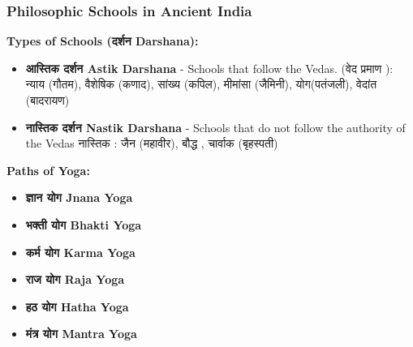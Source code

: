 \begin{frame}[fragile]\frametitle{Philosophic Schools in Ancient India}
    \textbf{Types of Schools (दर्शन  Darshana):}
    \begin{itemize}
        \item \textbf{आस्तिक  दर्शन Astik Darshana} - Schools that follow the Vedas. (वेद प्रमाण ): न्याय (गौतम), वैशेषिक (कणाद), सांख्य (कपिल), मीमांसा (जैमिनी), योग(पतंजली), वेदांत (बादरायण)
        \item \textbf{नास्तिक  दर्शन  Nastik Darshana} - Schools that do not follow the authority of the Vedas नास्तिक : जैन (महावीर), बौद्ध , चार्वाक (बृहस्पती)
    \end{itemize}
	
    \textbf{Paths of Yoga:}
    \begin{itemize}
        \item \textbf{ज्ञान योग Jnana Yoga}
        \item \textbf{भक्ती योग  Bhakti Yoga}
        \item \textbf{कर्म योग Karma Yoga}
        \item \textbf{राज योग Raja Yoga}
        \item \textbf{हठ योग Hatha Yoga}
        \item \textbf{मंत्र योग Mantra Yoga}
    \end{itemize}	
\end{frame}


